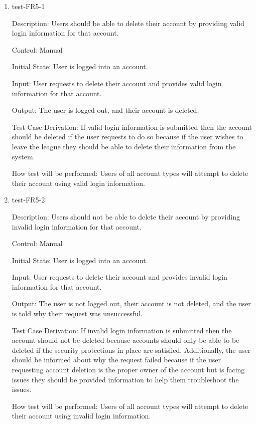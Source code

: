 \documentclass[12pt, titlepage]{article}
\begin{document}
\begin{enumerate}
  \item{test-FR5-1\\}
  
  Description: Users should be able to delete their account by
  providing valid login information for that account.

  Control: Manual

  Initial State: User is logged into an account.

  Input: User requests to delete their account and provides valid login
  information for that account.

  Output: The user is logged out, and their account is deleted.

  Test Case Derivation: If valid login information is submitted then the
  account should be deleted if the user requests to do so because if the user
  wishes to leave the league they should be able to delete their information
  from the system.

  How test will be performed: Users of all account types will attempt to delete
  their account using valid login information.

  \item{test-FR5-2\\}
  
  Description: Users should not be able to delete their account by
  providing invalid login information for that account.

  Control: Manual

  Initial State: User is logged into an account.

  Input: User requests to delete their account and provides invalid login
  information for that account.

  Output: The user is not logged out, their account is not deleted, and
  the user is told why their request was unsuccessful.

  Test Case Derivation: If invalid login information is submitted then the
  account should not be deleted because accounts should only be able to be
  deleted if the security protections in place are satisfied. Additionally,
  the user should be informed about why the request failed because if the
  user requesting account deletion is the proper owner of the account but is
  facing issues they should be provided information to help them troubleshoot
  the issues.

  How test will be performed: Users of all account types will attempt to delete
  their account using invalid login information.


\end{enumerate}
\end{document}
